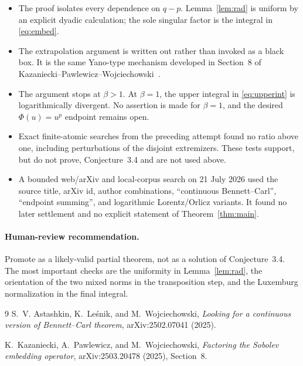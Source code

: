 \documentclass[11pt]{article}
\begin{document}
\begin{itemize}
\item The proof isolates every dependence on $q-p$.  Lemma~\ref{lem:rad}
is uniform by an explicit dyadic calculation; the sole singular factor is
the integral in \eqref{eq:embed}.
\item The extrapolation argument is written out rather than invoked as a
black box.  It is the same Yano-type mechanism developed in Section~8 of
Kazaniecki--Pawlewicz--Wojciechowski~\cite{KPW}.
\item The argument stops at $\beta>1$.  At $\beta=1$, the upper integral in
\eqref{eq:upperint} is logarithmically divergent.  No assertion is made for
$\beta=1$, and the desired $\Phi(u)=u^p$ endpoint remains open.
\item Exact finite-atomic searches from the preceding attempt found no ratio
above one, including perturbations of the disjoint extremizers.  These tests
support, but do not prove, Conjecture~3.4 and are not used above.
\item A bounded web/arXiv and local-corpus search on 21 July 2026 used the
source title, arXiv id, author combinations, ``continuous Bennett--Carl'',
``endpoint summing'', and logarithmic Lorentz/Orlicz variants.  It found no
later settlement and no explicit statement of Theorem~\ref{thm:main}.
\end{itemize}

\paragraph{Human-review recommendation.}
Promote as a likely-valid partial theorem, not as a solution of Conjecture~3.4.
The most important checks are the uniformity in Lemma~\ref{lem:rad}, the
orientation of the two mixed norms in the transposition step, and the
Luxemburg normalization in the final integral.

\begin{thebibliography}{9}
S.~V. Astashkin, K.~Le\'snik, and M.~Wojciechowski,
\emph{Looking for a continuous version of Bennett--Carl theorem},
arXiv:2502.07041 (2025).

K.~Kazaniecki, A.~Pawlewicz, and M.~Wojciechowski,
\emph{Factoring the Sobolev embedding operator},
arXiv:2503.20478 (2025), Section~8.
\end{thebibliography}
\end{document}
